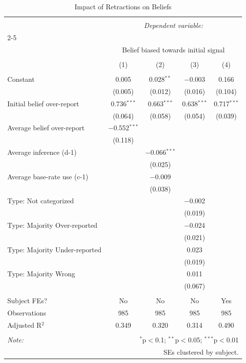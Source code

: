 
\begin{table}[!htbp] \centering 
  \caption{Impact of Retractions on Beliefs} 
  \label{} 
\begin{tabular}{@{\extracolsep{5pt}}lcccc} 
\\[-1.8ex]\hline 
\hline \\[-1.8ex] 
 & \multicolumn{4}{c}{\textit{Dependent variable:}} \\ 
\cline{2-5} 
\\[-1.8ex] & \multicolumn{4}{c}{Belief biased towards initial signal} \\ 
\\[-1.8ex] & (1) & (2) & (3) & (4)\\ 
\hline \\[-1.8ex] 
 Constant & 0.005 & 0.028$^{**}$ & $-$0.003 & 0.166 \\ 
  & (0.005) & (0.012) & (0.016) & (0.104) \\ 
  Initial belief over-report & 0.736$^{***}$ & 0.663$^{***}$ & 0.638$^{***}$ & 0.717$^{***}$ \\ 
  & (0.064) & (0.058) & (0.054) & (0.039) \\ 
  Average belief over-report & $-$0.552$^{***}$ &  &  &  \\ 
  & (0.118) &  &  &  \\ 
  Average inference (d-1) &  & $-$0.066$^{***}$ &  &  \\ 
  &  & (0.025) &  &  \\ 
  Average base-rate use (c-1) &  & $-$0.009 &  &  \\ 
  &  & (0.038) &  &  \\ 
  Type: Not categorized &  &  & $-$0.002 &  \\ 
  &  &  & (0.019) &  \\ 
  Type: Majority Over-reported &  &  & $-$0.024 &  \\ 
  &  &  & (0.021) &  \\ 
  Type: Majority Under-reported &  &  & 0.023 &  \\ 
  &  &  & (0.019) &  \\ 
  Type: Majority Wrong &  &  & 0.011 &  \\ 
  &  &  & (0.067) &  \\ 
 \hline \\[-1.8ex] 
Subject FEs? & No & No & No & Yes \\ 
Observations & 985 & 985 & 985 & 985 \\ 
Adjusted R$^{2}$ & 0.349 & 0.320 & 0.314 & 0.490 \\ 
\hline 
\hline \\[-1.8ex] 
\textit{Note:}  & \multicolumn{4}{r}{$^{*}$p$<$0.1; $^{**}$p$<$0.05; $^{***}$p$<$0.01} \\ 
 & \multicolumn{4}{r}{SEs clustered by subject.} \\ 
\end{tabular} 
\end{table} 
